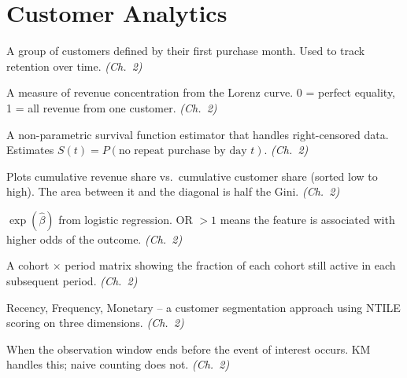 \section*{Customer Analytics}

\begin{description}[style=nextline, leftmargin=2em]

\item[\textbf{Cohort}] A group of customers defined by their first purchase month. Used to track retention over time. \textit{(Ch.~2)}

\item[\textbf{Gini Coefficient}] A measure of revenue concentration from the Lorenz curve. 0 = perfect equality, 1 = all revenue from one customer. \textit{(Ch.~2)}

\item[\textbf{Kaplan-Meier Estimator}] A non-parametric survival function estimator that handles right-censored data. Estimates $S(t) = P(\text{no repeat purchase by day } t)$. \textit{(Ch.~2)}

\item[\textbf{Lorenz Curve}] Plots cumulative revenue share vs.\ cumulative customer share (sorted low to high). The area between it and the diagonal is half the Gini. \textit{(Ch.~2)}

\item[\textbf{Odds Ratio}] $\exp(\hat{\beta})$ from logistic regression. OR $> 1$ means the feature is associated with higher odds of the outcome. \textit{(Ch.~2)}

\item[\textbf{Retention Matrix}] A cohort $\times$ period matrix showing the fraction of each cohort still active in each subsequent period. \textit{(Ch.~2)}

\item[\textbf{RFM}] Recency, Frequency, Monetary -- a customer segmentation approach using NTILE scoring on three dimensions. \textit{(Ch.~2)}

\item[\textbf{Right-Censoring}] When the observation window ends before the event of interest occurs. KM handles this; naive counting does not. \textit{(Ch.~2)}

\end{description}

